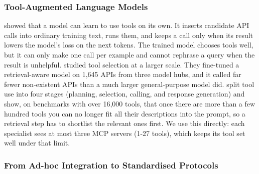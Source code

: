 \subsubsection{Tool-Augmented Language Models}

\cite{schick_toolformer_2023} showed that a model can learn to use tools on its own. It inserts candidate API calls into ordinary training text, runs them, and keeps a call only when its result lowers the model's loss on the next tokens. The trained model chooses tools well, but it can only make one call per example and cannot rephrase a query when the result is unhelpful. \cite{patil_gorilla_2023} studied tool selection at a larger scale. They fine-tuned a retrieval-aware model on 1{,}645 APIs from three model hubs, and it called far fewer non-existent APIs than a much larger general-purpose model did. \cite{qu_tool_2024} split tool use into four stages (planning, selection, calling, and response generation) and show, on benchmarks with over 16{,}000 tools, that once there are more than a few hundred tools you can no longer fit all their descriptions into the prompt, so a retrieval step has to shortlist the relevant ones first. We use this directly: each specialist sees at most three MCP servers (1-27 tools), which keeps its tool set well under that limit.

\subsubsection{From Ad-hoc Integration to Standardised Protocols}

